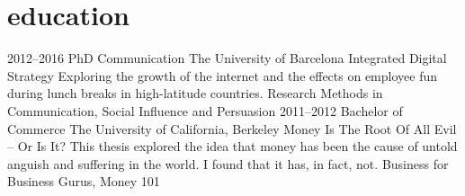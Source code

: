 \section{education}

\begin{entrylist}
\courseentry
{2012--2016}
{PhD {\normalfont Communication}}
{The University of Barcelona}
{Integrated Digital Strategy}
{Exploring the growth of the internet and the effects on employee fun during lunch breaks in high-latitude countries.}
{Research Methods in Communication, Social Influence and Persuasion}
\courseentry
{2011--2012}
{Bachelor {\normalfont of Commerce}}
{The University of California, Berkeley}
{Money Is The Root Of All Evil -- Or Is It?}
{This thesis explored the idea that money has been the cause of untold anguish and suffering in the world. I found that it has, in fact, not.}
{Business for Business Gurus, Money 101}
\end{entrylist}